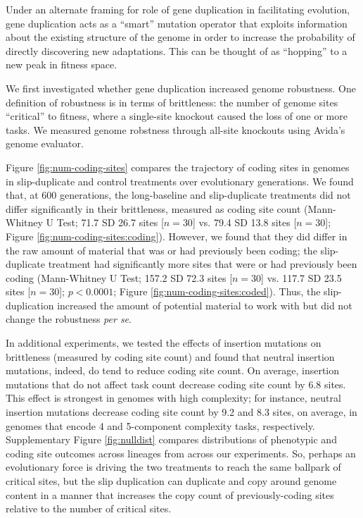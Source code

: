 Under an alternate framing for role of gene duplication in facilitating evolution, gene duplication acts as a ``smart'' mutation operator that exploits information about the existing structure of the genome in order to increase the probability of directly discovering new adaptations.
This can be thought of as ``hopping'' to a new peak in fitness space.

We first investigated whether gene duplication increased genome robustness.
One definition of robustness is in terms of brittleness: the number of genome sites ``critical'' to fitness, where a single-site knockout caused the loss of one or more tasks.
We measured genome robstness through all-site knockouts using Avida's genome evaluator.



Figure \ref{fig:num-coding-sites} compares the trajectory of coding sites in genomes in slip-duplicate and control treatments over evolutionary generations.
We found that, at 600 generations, the long-baseline and slip-duplicate treatments did not differ significantly in their brittleness, measured as coding site count (Mann-Whitney U Test; 71.7 SD 26.7 sites [$n=30$] vs. 79.4 SD 13.8 sites [$n=30$]; Figure \ref{fig:num-coding-sites:coding}).
However, we found that they did differ in the raw amount of material that was or had previously been coding; the slip-duplicate treatment had significantly more sites that were or had previously been coding (Mann-Whitney U Test; 157.2 SD 72.3 sites [$n=30$] vs. 117.7 SD 23.5 sites [$n=30$]; $p < 0.0001$; Figure \ref{fig:num-coding-sites:coded}).
Thus, the slip-duplication increased the amount of potential material to work with but did not change the robustness \textit{per se}.

In additional experiments, we tested the effects of insertion mutations on brittleness (measured by coding site count) and found that neutral insertion mutations, indeed, do tend to reduce coding site count.
On average, insertion mutations that do not affect task count decrease coding site count by 6.8 sites.
This effect is strongest in genomes with high complexity; for instance, neutral insertion mutations decrease coding site count by 9.2 and 8.3 sites, on average, in genomes that encode 4 and 5-component complexity tasks, respectively.
Supplementary Figure \ref{fig:nulldist} compares distributions of phenotypic and coding site outcomes across lineages from across our experiments.
So, perhaps an evolutionary force is driving the two treatments to reach the same ballpark of critical sites, but the slip duplication can duplicate and copy around genome content in a manner that increases the copy count of previously-coding sites relative to the number of critical sites.


